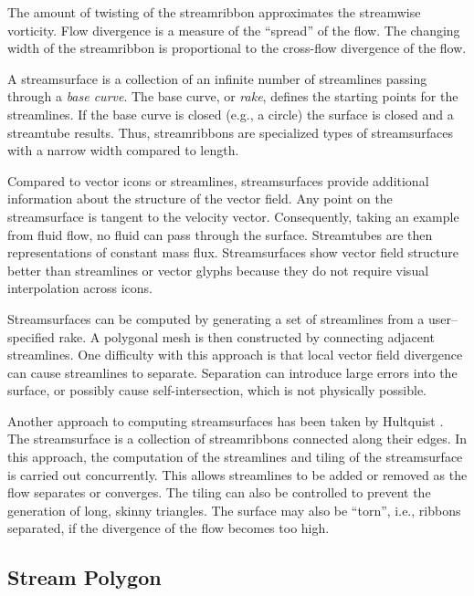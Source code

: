 The amount of twisting of the streamribbon approximates the streamwise vorticity. Flow divergence is a measure of the ``spread'' of the flow. The changing width of the streamribbon is proportional to the cross-flow divergence of the flow.

A streamsurface is a collection of an infinite number of streamlines passing through a \emph{base curve}. The base curve, or \emph{rake}, defines the starting points for the streamlines. If the base curve is closed (e.g., a circle) the surface is closed and a streamtube results. Thus, streamribbons are specialized types of streamsurfaces with a narrow width compared to length.

Compared to vector icons or streamlines, streamsurfaces provide additional information about the structure of the vector field. Any point on the streamsurface is tangent to the velocity vector. Consequently, taking an example from fluid flow, no fluid can pass through the surface. Streamtubes are then representations of constant mass flux. Streamsurfaces show vector field structure better than streamlines or vector glyphs because they do not require visual interpolation across icons.

Streamsurfaces can be computed by generating a set of streamlines from a user--specified rake. A polygonal mesh is then constructed by connecting adjacent streamlines. One difficulty with this approach is that local vector field divergence can cause streamlines to separate. Separation can introduce large errors into the surface, or possibly cause self-intersection, which is not physically possible.

Another approach to computing streamsurfaces has been taken by Hultquist \cite{Hultquist92}. The streamsurface is a collection of streamribbons connected along their edges. In this approach, the computation of the streamlines and tiling of the streamsurface is carried out concurrently. This allows streamlines to be added or removed as the flow separates or converges. The tiling can also be controlled to prevent the generation of long, skinny triangles. The surface may also be ``torn'', i.e., ribbons separated, if the divergence of the flow becomes too high.

\subsection{Stream Polygon}


